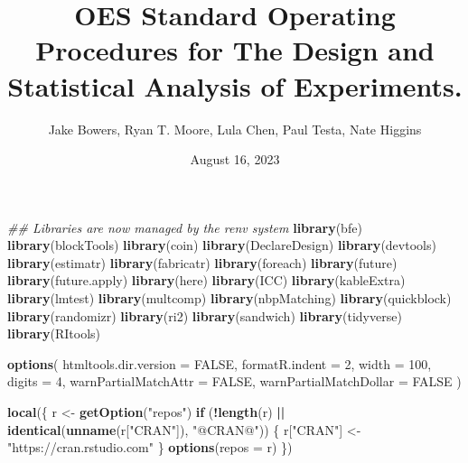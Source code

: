 \documentclass[
  12pt,
]{book}
\title{OES Standard Operating Procedures for The Design and Statistical
Analysis of Experiments.}
\author{Jake Bowers, Ryan T. Moore, Lula Chen, Paul Testa, Nate Higgins}
\date{August 16, 2023}
\newenvironment{Shaded}{\begin{snugshade}}{\end{snugshade}}
\newcommand{\CommentTok}[1]{\textcolor[rgb]{0.56,0.35,0.01}{\textit{#1}}}
\newcommand{\ControlFlowTok}[1]{\textcolor[rgb]{0.13,0.29,0.53}{\textbf{#1}}}
\newcommand{\DataTypeTok}[1]{\textcolor[rgb]{0.13,0.29,0.53}{#1}}
\newcommand{\DecValTok}[1]{\textcolor[rgb]{0.00,0.00,0.81}{#1}}
\newcommand{\KeywordTok}[1]{\textcolor[rgb]{0.13,0.29,0.53}{\textbf{#1}}}
\newcommand{\NormalTok}[1]{#1}
\newcommand{\OperatorTok}[1]{\textcolor[rgb]{0.81,0.36,0.00}{\textbf{#1}}}
\newcommand{\OtherTok}[1]{\textcolor[rgb]{0.56,0.35,0.01}{#1}}
\newcommand{\StringTok}[1]{\textcolor[rgb]{0.31,0.60,0.02}{#1}}
\theoremstyle{definition}
\theoremstyle{definition}
\theoremstyle{definition}
\theoremstyle{remark}
\begin{document}
\maketitle

{
\hypersetup{linkcolor=}
\setcounter{tocdepth}{1}
\tableofcontents
}
\listoftables
\listoffigures
\begin{Shaded}
\begin{Highlighting}[]
\CommentTok{## Libraries are now managed by the renv system}
\KeywordTok{library}\NormalTok{(bfe)}
\KeywordTok{library}\NormalTok{(blockTools)}
\KeywordTok{library}\NormalTok{(coin)}
\KeywordTok{library}\NormalTok{(DeclareDesign)}
\KeywordTok{library}\NormalTok{(devtools)}
\KeywordTok{library}\NormalTok{(estimatr)}
\KeywordTok{library}\NormalTok{(fabricatr)}
\KeywordTok{library}\NormalTok{(foreach)}
\KeywordTok{library}\NormalTok{(future)}
\KeywordTok{library}\NormalTok{(future.apply)}
\KeywordTok{library}\NormalTok{(here)}
\KeywordTok{library}\NormalTok{(ICC)}
\KeywordTok{library}\NormalTok{(kableExtra)}
\KeywordTok{library}\NormalTok{(lmtest)}
\KeywordTok{library}\NormalTok{(multcomp)}
\KeywordTok{library}\NormalTok{(nbpMatching)}
\KeywordTok{library}\NormalTok{(quickblock)}
\KeywordTok{library}\NormalTok{(randomizr)}
\KeywordTok{library}\NormalTok{(ri2)}
\KeywordTok{library}\NormalTok{(sandwich)}
\KeywordTok{library}\NormalTok{(tidyverse)}
\KeywordTok{library}\NormalTok{(RItools)}

\KeywordTok{options}\NormalTok{(}
  \DataTypeTok{htmltools.dir.version =} \OtherTok{FALSE}\NormalTok{, }\DataTypeTok{formatR.indent =} \DecValTok{2}\NormalTok{,}
  \DataTypeTok{width =} \DecValTok{100}\NormalTok{, }\DataTypeTok{digits =} \DecValTok{4}\NormalTok{, }\DataTypeTok{warnPartialMatchAttr =} \OtherTok{FALSE}\NormalTok{, }\DataTypeTok{warnPartialMatchDollar =} \OtherTok{FALSE}
\NormalTok{)}

\KeywordTok{local}\NormalTok{(\{}
\NormalTok{  r <-}\StringTok{ }\KeywordTok{getOption}\NormalTok{(}\StringTok{"repos"}\NormalTok{)}
  \ControlFlowTok{if}\NormalTok{ (}\OperatorTok{!}\KeywordTok{length}\NormalTok{(r) }\OperatorTok{||}\StringTok{ }\KeywordTok{identical}\NormalTok{(}\KeywordTok{unname}\NormalTok{(r[}\StringTok{"CRAN"}\NormalTok{]), }\StringTok{"@CRAN@"}\NormalTok{)) \{}
\NormalTok{    r[}\StringTok{"CRAN"}\NormalTok{] <-}\StringTok{ "https://cran.rstudio.com"}
\NormalTok{  \}}
  \KeywordTok{options}\NormalTok{(}\DataTypeTok{repos =}\NormalTok{ r)}
\NormalTok{\})}
\end{Highlighting}
\end{Shaded}
\end{document}
